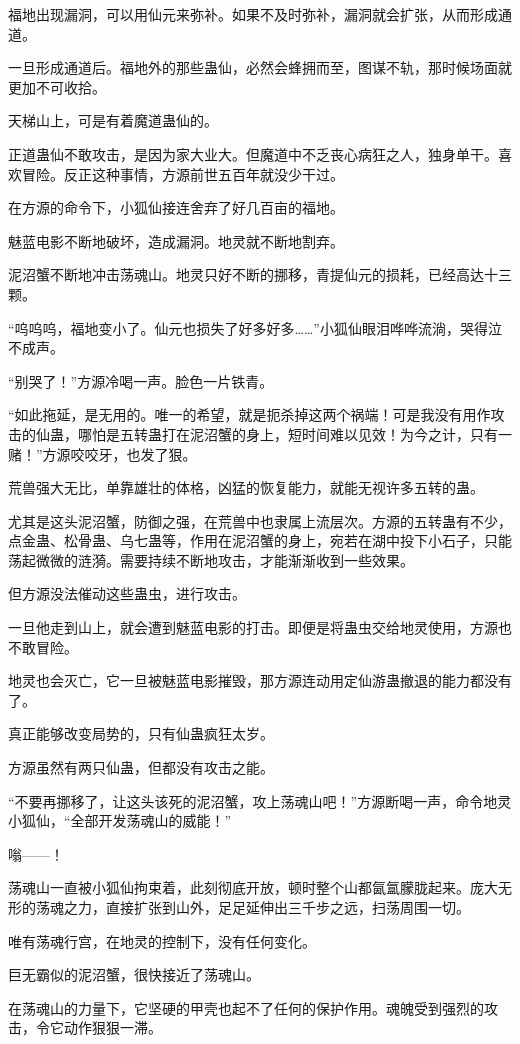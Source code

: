 \begin{this_body}
福地出现漏洞，可以用仙元来弥补。如果不及时弥补，漏洞就会扩张，从而形成通道。

一旦形成通道后。福地外的那些蛊仙，必然会蜂拥而至，图谋不轨，那时候场面就更加不可收拾。

天梯山上，可是有着魔道蛊仙的。

正道蛊仙不敢攻击，是因为家大业大。但魔道中不乏丧心病狂之人，独身单干。喜欢冒险。反正这种事情，方源前世五百年就没少干过。

在方源的命令下，小狐仙接连舍弃了好几百亩的福地。

魅蓝电影不断地破坏，造成漏洞。地灵就不断地割弃。

泥沼蟹不断地冲击荡魂山。地灵只好不断的挪移，青提仙元的损耗，已经高达十三颗。

“呜呜呜，福地变小了。仙元也损失了好多好多……”小狐仙眼泪哗哗流淌，哭得泣不成声。

“别哭了！”方源冷喝一声。脸色一片铁青。

“如此拖延，是无用的。唯一的希望，就是扼杀掉这两个祸端！可是我没有用作攻击的仙蛊，哪怕是五转蛊打在泥沼蟹的身上，短时间难以见效！为今之计，只有一赌！”方源咬咬牙，也发了狠。

荒兽强大无比，单靠雄壮的体格，凶猛的恢复能力，就能无视许多五转的蛊。

尤其是这头泥沼蟹，防御之强，在荒兽中也隶属上流层次。方源的五转蛊有不少，点金蛊、松骨蛊、乌七蛊等，作用在泥沼蟹的身上，宛若在湖中投下小石子，只能荡起微微的涟漪。需要持续不断地攻击，才能渐渐收到一些效果。

但方源没法催动这些蛊虫，进行攻击。

一旦他走到山上，就会遭到魅蓝电影的打击。即便是将蛊虫交给地灵使用，方源也不敢冒险。

地灵也会灭亡，它一旦被魅蓝电影摧毁，那方源连动用定仙游蛊撤退的能力都没有了。

真正能够改变局势的，只有仙蛊疯狂太岁。

方源虽然有两只仙蛊，但都没有攻击之能。

“不要再挪移了，让这头该死的泥沼蟹，攻上荡魂山吧！”方源断喝一声，命令地灵小狐仙，“全部开发荡魂山的威能！”

嗡——！

荡魂山一直被小狐仙拘束着，此刻彻底开放，顿时整个山都氤氲朦胧起来。庞大无形的荡魂之力，直接扩张到山外，足足延伸出三千步之远，扫荡周围一切。

唯有荡魂行宫，在地灵的控制下，没有任何变化。

巨无霸似的泥沼蟹，很快接近了荡魂山。

在荡魂山的力量下，它坚硬的甲壳也起不了任何的保护作用。魂魄受到强烈的攻击，令它动作狠狠一滞。


\end{this_body}
